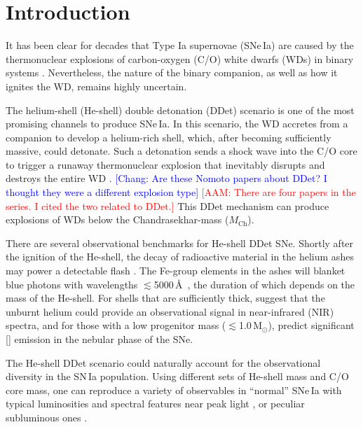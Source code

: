 \documentclass[twocolumn]{aastex631}
\newcommand{\Mch}{$M_\mathrm{Ch}$}
\newcommand{\Msun}{\mathrm{M_\odot}}
\newcommand{\adam}[1]{\textcolor{red}{[AAM: #1]}}
\newcommand{\chang}[1]{\textcolor{blue}{[Chang: #1]}}
\begin{document}

\section{Introduction} \label{sec:intro}
It has been clear for decades that Type Ia supernovae (SNe\,Ia) are caused by the thermonuclear explosions of carbon-oxygen (C/O) white dwarfs (WDs) in binary systems \citep[see][for a review]{Maoz_2014}. Nevertheless, the nature of the binary companion, as well as how it ignites the WD, remains highly uncertain. 

The helium-shell (He-shell) double detonation (DDet) scenario is one of the most promising channels to produce SNe\,Ia. In this scenario, the WD accretes from a companion to develop a helium-rich shell, which, after becoming sufficiently massive, could detonate. Such a detonation sends a shock wave into the C/O core to trigger a runaway thermonuclear explosion that inevitably disrupts and destroys the entire WD \citep{Nomoto_1982a, Nomoto_1982b, Woosley_1986, Livne_1990, Woosley_1994, Livne_1995}. \chang{Are these Nomoto papers about DDet? I thought they were a different explosion type} \adam{There are four papers in the series. I cited the two related to DDet.} This DDet mechanism can produce explosions of WDs below the Chandrasekhar-mass (\Mch).

There are several observational benchmarks for He-shell DDet SNe. Shortly after the ignition of the He-shell, the decay of radioactive material in the helium ashes may power a detectable flash \citep{Woosley_1994,Fink_DD_2010,Kromer_DD_2010}. The Fe-group elements in the ashes will blanket blue photons with wavelengths $\lesssim$5000\,\AA\ \citep{Kromer_DD_2010}, the duration of which depends on the mass of the He-shell. For shells that are sufficiently thick, \citet{Boyle2017_Helium} suggest that the unburnt helium could provide an observational signal in near-infrared (NIR) spectra, and for those with a low progenitor mass ($\lesssim$1.0\,$\Msun$), \citet{polin_nebular_2021} predict significant [] emission in the nebular phase of the SNe.

The He-shell DDet scenario could naturally account for the observational diversity in the SN\,Ia population. Using different sets of He-shell mass and C/O core mass, one can reproduce a variety of observables in ``normal'' SNe\,Ia with typical luminosities and spectral features near peak light \citep[e.g.,][]{polin_observational_2019,Townsley_2019,Shen_2D_2021}, or peculiar subluminous ones \citep[e.g.,][]{polin_observational_2019}. 
\end{document}

